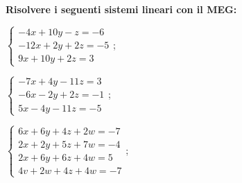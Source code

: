 \begin{exer}
    \textbf{Risolvere i seguenti sistemi lineari con il MEG:}

    $
        \begin{cases}
            -4x + 10y - z = -6 \\
            -12x + 2y + 2z = -5 \\
            9x + 10y + 2z = 3
        \end{cases}
    $;

    $
        \begin{cases}
            -7x + 4y - 11z = 3 \\
            -6x - 2y + 2z = -1 \\
            5x - 4y - 11z = -5
        \end{cases}
    $;

    $
        \begin{cases}
            6x + 6y + 4z + 2w = -7 \\
            2x + 2y + 5z + 7w = -4 \\
            2x + 6y + 6z + 4w = 5 \\
            4v + 2w + 4z + 4w = -7
        \end{cases}
    $;
\end{exer}